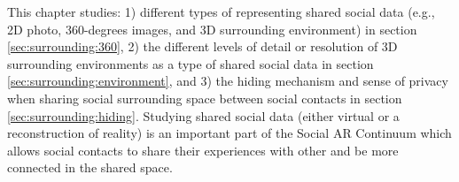 This chapter studies: 1) different types of representing shared social data (e.g., 2D photo, 360-degrees images, and 3D surrounding environment) in section \ref{sec:surrounding:360}, 2) the different levels of detail or resolution of 3D surrounding environments as a type of shared social data in section \ref{sec:surrounding:environment}, and 3) the hiding mechanism and sense of privacy when sharing social surrounding space between social contacts in section \ref{sec:surrounding:hiding}. Studying shared social data (either virtual or a reconstruction of reality) is an important part of the Social AR Continuum which allows social contacts to share their experiences with other and be more connected in the shared space. 






